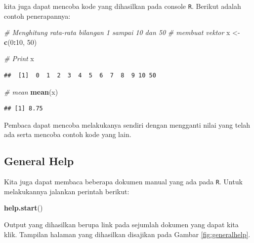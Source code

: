 \documentclass[]{book}
\newenvironment{Shaded}{\begin{snugshade}}{\end{snugshade}}
\newcommand{\KeywordTok}[1]{\textcolor[rgb]{0.13,0.29,0.53}{\textbf{#1}}}
\newcommand{\DecValTok}[1]{\textcolor[rgb]{0.00,0.00,0.81}{#1}}
\newcommand{\StringTok}[1]{\textcolor[rgb]{0.31,0.60,0.02}{#1}}
\newcommand{\CommentTok}[1]{\textcolor[rgb]{0.56,0.35,0.01}{\textit{#1}}}
\newcommand{\OperatorTok}[1]{\textcolor[rgb]{0.81,0.36,0.00}{\textbf{#1}}}
\newcommand{\NormalTok}[1]{#1}
\begin{document}
kita juga dapat mencoba kode yang dihasilkan pada console \texttt{R}.
Berikut adalah contoh penerapannya:

\begin{Shaded}
\begin{Highlighting}[]
\CommentTok{# Menghitung rata-rata bilangan 1 sampai 10 dan 50}
\CommentTok{# membuat vektor}
\NormalTok{x <-}\StringTok{ }\KeywordTok{c}\NormalTok{(}\DecValTok{0}\OperatorTok{:}\DecValTok{10}\NormalTok{, }\DecValTok{50}\NormalTok{)}

\CommentTok{# Print}
\NormalTok{x}
\end{Highlighting}
\end{Shaded}

\begin{verbatim}
##  [1]  0  1  2  3  4  5  6  7  8  9 10 50
\end{verbatim}

\begin{Shaded}
\begin{Highlighting}[]
\CommentTok{# mean}
\KeywordTok{mean}\NormalTok{(x)}
\end{Highlighting}
\end{Shaded}

\begin{verbatim}
## [1] 8.75
\end{verbatim}

Pembaca dapat mencoba melakukanya sendiri dengan mengganti nilai yang
telah ada serta mencoba contoh kode yang lain.

\subsection{General Help}\label{general-help}

Kita juga dapat membaca beberapa dokumen manual yang ada pada
\texttt{R}. Untuk melakukannya jalankan perintah berikut:

\begin{Shaded}
\begin{Highlighting}[]
\KeywordTok{help.start}\NormalTok{()}
\end{Highlighting}
\end{Shaded}

Output yang dihasilkan berupa link pada sejumlah dokumen yang dapat kita
klik. Tampilan halaman yang dihasilkan disajikan pada Gambar
\ref{fig:generalhelp}.
\end{document}
